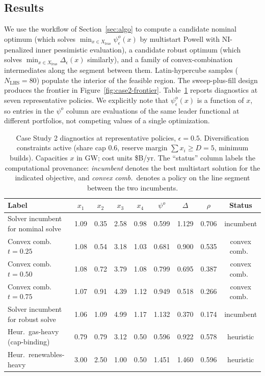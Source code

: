 \documentclass[11pt]{article}
\theoremstyle{definition}
\newcommand{\eps}{\epsilon}
\begin{document}
\subsection{Results}
We use the workflow of Section~\ref{sec:algo} to compute a
candidate nominal optimum (which solves
$\min_{x\in X_\mathrm{feas}}\psi_\eps^o(x)$ by multistart Powell
with NI-penalized inner pessimistic evaluation), a candidate
robust optimum (which solves
$\min_{x\in X_\mathrm{feas}}\Delta_\eps(x)$ similarly), and a
family of convex-combination intermediates along the segment
between them. Latin-hypercube samples ($N_\mathrm{LHS}=80$)
populate the interior of the feasible region. The sweep-plus-fill
design produces the frontier in Figure~\ref{fig:case2-frontier}.
Table~\ref{tab:case2-policies} reports diagnostics at seven
representative policies. We explicitly note that $\psi_\eps^o(x)$
is a function of $x$, so entries in the $\psi^o$ column are
evaluations of the same leader functional at different
portfolios, not competing values of a single optimization.

\begin{table}[ht]
\centering
\caption{Case Study 2 diagnostics at representative policies,
$\eps=0.5$. Diversification constraints active (share cap 0.6,
reserve margin $\sum x_i\ge D=5$, minimum builds). Capacities
$x$ in GW; cost units \$B/yr. The ``status'' column labels the
computational provenance: \emph{incumbent} denotes the best
multistart solution for the indicated objective, and
\emph{convex comb.}\ denotes a policy on the line segment
between the two incumbents.}
\label{tab:case2-policies}
\small
\begin{tabular}{@{}lcccccccc@{}}
\toprule
Label & $x_1$ & $x_2$ & $x_3$ & $x_4$ &
$\psi^o$ & $\Delta$ & $\rho$ & Status\\
\midrule
Solver incumbent for nominal solve  & 1.09 & 0.35 & 2.58 & 0.98 & 0.599 & 1.129 & 0.706 & incumbent \\
Convex comb.\ $t{=}0.25$             & 1.08 & 0.54 & 3.18 & 1.03 & 0.681 & 0.900 & 0.535 & convex comb.\ \\
Convex comb.\ $t{=}0.50$             & 1.08 & 0.72 & 3.79 & 1.08 & 0.799 & 0.695 & 0.387 & convex comb.\ \\
Convex comb.\ $t{=}0.75$             & 1.07 & 0.91 & 4.39 & 1.12 & 0.949 & 0.518 & 0.266 & convex comb.\ \\
Solver incumbent for robust solve   & 1.06 & 1.09 & 4.99 & 1.17 & 1.132 & 0.370 & 0.174 & incumbent \\
Heur.\ gas-heavy (cap-binding)      & 0.79 & 0.79 & 3.12 & 0.50 & 0.596 & 0.922 & 0.578 & heuristic \\
Heur.\ renewables-heavy             & 3.00 & 2.50 & 1.00 & 0.50 & 1.451 & 1.460 & 0.596 & heuristic \\
\bottomrule
\end{tabular}
\end{table}
\end{document}
